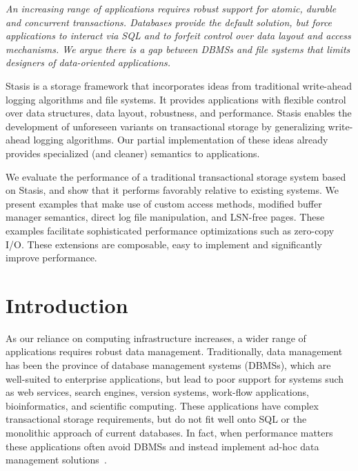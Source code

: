 \documentclass[letterpaper,twocolumn,10pt]{article}
\newcommand{\yad}{Stasis\xspace}
\begin{document}
{\em An increasing range of applications requires robust support for atomic, durable and concurrent
transactions.  Databases provide the default solution, but force
applications to interact via SQL and to forfeit control over data
layout and access mechanisms.  We argue there is a gap between DBMSs and file systems that limits designers of data-oriented applications.

\yad is a storage framework that incorporates ideas from traditional
write-ahead logging algorithms and file systems.
It provides applications with flexible control over data structures, data layout, robustness, and performance.
\yad enables the development of
unforeseen variants on transactional storage by generalizing
write-ahead logging algorithms.  Our partial implementation of these
ideas already provides specialized (and cleaner) semantics to applications.

We evaluate the performance of a traditional transactional storage
system based on \yad, and show that it performs favorably relative to existing
systems.  We present examples that make use of custom access methods, modified
buffer manager semantics, direct log file manipulation, and LSN-free
pages.  These examples facilitate sophisticated performance 
optimizations such as zero-copy I/O.  These extensions are composable,
easy to implement and significantly improve performance.

}





\section{Introduction}
\label{sec:intro}
As our reliance on computing infrastructure increases, a wider range
of applications requires robust data management.  Traditionally, data
management has been the province of database management systems
(DBMSs), which are well-suited to enterprise applications, but lead to
poor support for systems such as web services, search engines, version
systems, work-flow applications, bioinformatics, and
scientific computing.  These applications have complex transactional
storage requirements, but do not fit well onto SQL or the monolithic
approach of current databases.  In fact, when performance matters
these applications often avoid DBMSs and instead implement ad-hoc data
management solutions~\cite{mapReduce,SNS}.
\end{document}
